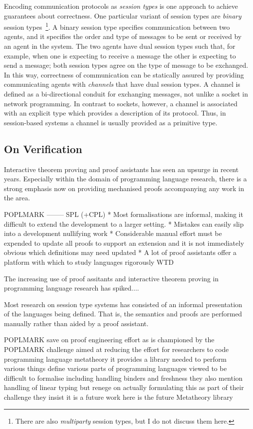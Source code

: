 \documentclass{mprop}
\begin{document}
Encoding communication protocols as \textit{session types} is one approach to achieve guarantees about correctness. One particular variant of session types are \textit{binary} session types~\footnote{There are also \textit{multiparty} session types, but I do not discuss them here.}. A binary session type specifies communication between two agents, and it specifies the order and type of messages to be sent or received by an agent in the system. The two agents have dual session types such that, for example, when one is expecting to receive a message the other is expecting to send a message; both session types agree on the type of message to be exchanged. In this way, correctness of communication can be statically assured by providing communicating agents with \textit{channels} that have dual session types. A channel is defined as a bi-directional conduit for exchanging messages, not unlike a socket in network programming. In contrast to sockets, however, a channel is associated with an explicit type which provides a description of its protocol. Thus, in session-based systems a channel is usually provided as a primitive type.

\subsection{On Verification}

Interactive theorem proving and proof assistants has seen an upsurge in recent years. Especially within the domain of programming language research, there is a strong emphasis now on providing mechanised proofs accompanying any work in the area. 

POPLMARK
--------
SPL (+CPL)
* Most formalisations are informal, making it difficult to extend the development to a larger setting.
* Mistakes can easily slip into a development nullifying work
* Considerable manual effort must be expended to update all proofs to support an extension and it is not immediately obvious which definitions may need updated
* A lot of proof assistants offer a platform with which to study languages rigorously
WTD


The increasing use of proof assitants and interactive theorem proving in programming language research has spiked....

Most research on session type systems has consisted of an informal presentation of the languages being defined. That is, the semantics and proofs are performed manually rather than aided by a proof assistant.

POPLMARK
save on proof engineering effort as is championed by the POPLMARK challenge aimed at reducing the effort for researchers to code programming language metatheory it provides a library needed to perform various things define various parts of programming languages viewed to be difficult to formalise including handling binders and freshness they also mention handling of linear typing but renege on actually formulating this as part of their challenge they insist it is a future work here is the future
Metatheory library
\end{document}
